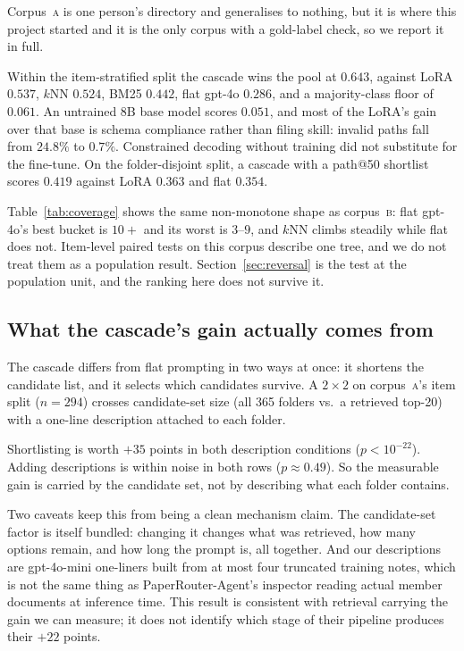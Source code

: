 \documentclass[11pt]{article}
\newcommand{\corpA}{\textsc{a}}
\newcommand{\corpB}{\textsc{b}}
\begin{document}
Corpus~\corpA{} is one person's directory and generalises to nothing, but it is where this project started and it is the only corpus with a gold-label check, so we report it in full.

Within the item-stratified split the cascade wins the pool at $0.643$, against LoRA $0.537$, $k$NN $0.524$, BM25 $0.442$, flat gpt-4o $0.286$, and a majority-class floor of $0.061$.
An untrained 8B base model scores $0.051$, and most of the LoRA's gain over that base is schema compliance rather than filing skill: invalid paths fall from $24.8\%$ to $0.7\%$.
Constrained decoding without training did not substitute for the fine-tune.
On the folder-disjoint split, a cascade with a path@50 shortlist scores $0.419$ against LoRA $0.363$ and flat $0.354$.

Table~\ref{tab:coverage} shows the same non-monotone shape as corpus~\corpB{}: flat gpt-4o's best bucket is $10{+}$ and its worst is $3$--$9$, and $k$NN climbs steadily while flat does not.
Item-level paired tests on this corpus describe one tree, and we do not treat them as a population result.
Section~\ref{sec:reversal} is the test at the population unit, and the ranking here does not survive it.

\subsection{What the cascade's gain actually comes from}
\label{sec:grounding}

The cascade differs from flat prompting in two ways at once: it shortens the candidate list, and it selects which candidates survive.
A $2\times2$ on corpus~\corpA{}'s item split ($n{=}294$) crosses candidate-set size (all 365 folders vs.\ a retrieved top-20) with a one-line description attached to each folder.

Shortlisting is worth $+35$ points in both description conditions ($p{<}10^{-22}$).
Adding descriptions is within noise in both rows ($p{\approx}0.49$).
So the measurable gain is carried by the candidate set, not by describing what each folder contains.

Two caveats keep this from being a clean mechanism claim.
The candidate-set factor is itself bundled: changing it changes what was retrieved, how many options remain, and how long the prompt is, all together.
And our descriptions are gpt-4o-mini one-liners built from at most four truncated training notes, which is not the same thing as PaperRouter-Agent's inspector reading actual member documents at inference time.
This result is consistent with retrieval carrying the gain we can measure; it does not identify which stage of their pipeline produces their $+22$ points.
\end{document}
